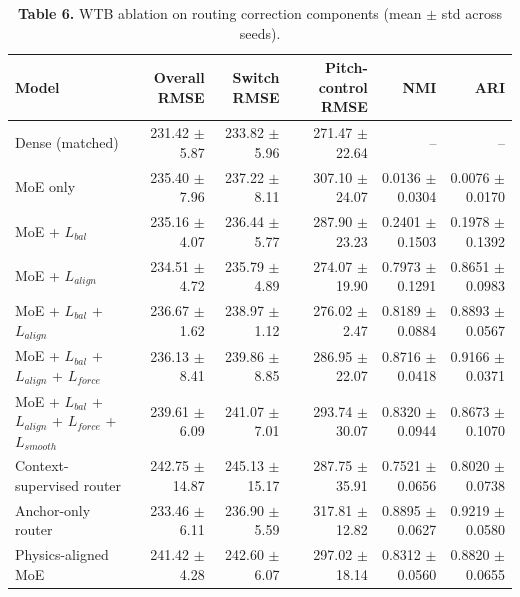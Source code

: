 \begin{table}[t]
\centering
\scriptsize
\setlength{\tabcolsep}{3pt}
\renewcommand{\arraystretch}{1.04}
\caption*{\textbf{Table 6.} WTB ablation on routing correction components (mean $\pm$ std across seeds).}
\begin{tabular}{lrrrrr}
\toprule
Model & Overall RMSE & Switch RMSE & Pitch-control RMSE & NMI & ARI \\
\midrule
Dense (matched) & 231.42 $\pm$ 5.87 & 233.82 $\pm$ 5.96 & 271.47 $\pm$ 22.64 & -- & -- \\
MoE only & 235.40 $\pm$ 7.96 & 237.22 $\pm$ 8.11 & 307.10 $\pm$ 24.07 & 0.0136 $\pm$ 0.0304 & 0.0076 $\pm$ 0.0170 \\
MoE + $L_{bal}$ & 235.16 $\pm$ 4.07 & 236.44 $\pm$ 5.77 & 287.90 $\pm$ 23.23 & 0.2401 $\pm$ 0.1503 & 0.1978 $\pm$ 0.1392 \\
MoE + $L_{align}$ & 234.51 $\pm$ 4.72 & 235.79 $\pm$ 4.89 & 274.07 $\pm$ 19.90 & 0.7973 $\pm$ 0.1291 & 0.8651 $\pm$ 0.0983 \\
MoE + $L_{bal}$ + $L_{align}$ & 236.67 $\pm$ 1.62 & 238.97 $\pm$ 1.12 & 276.02 $\pm$ 2.47 & 0.8189 $\pm$ 0.0884 & 0.8893 $\pm$ 0.0567 \\
MoE + $L_{bal}$ + $L_{align}$ + $L_{force}$ & 236.13 $\pm$ 8.41 & 239.86 $\pm$ 8.85 & 286.95 $\pm$ 22.07 & 0.8716 $\pm$ 0.0418 & 0.9166 $\pm$ 0.0371 \\
MoE + $L_{bal}$ + $L_{align}$ + $L_{force}$ + $L_{smooth}$ & 239.61 $\pm$ 6.09 & 241.07 $\pm$ 7.01 & 293.74 $\pm$ 30.07 & 0.8320 $\pm$ 0.0944 & 0.8673 $\pm$ 0.1070 \\
Context-supervised router & 242.75 $\pm$ 14.87 & 245.13 $\pm$ 15.17 & 287.75 $\pm$ 35.91 & 0.7521 $\pm$ 0.0656 & 0.8020 $\pm$ 0.0738 \\
Anchor-only router & 233.46 $\pm$ 6.11 & 236.90 $\pm$ 5.59 & 317.81 $\pm$ 12.82 & 0.8895 $\pm$ 0.0627 & 0.9219 $\pm$ 0.0580 \\
Physics-aligned MoE & 241.42 $\pm$ 4.28 & 242.60 $\pm$ 6.07 & 297.02 $\pm$ 18.14 & 0.8312 $\pm$ 0.0560 & 0.8820 $\pm$ 0.0655 \\
\bottomrule
\end{tabular}
\end{table}
